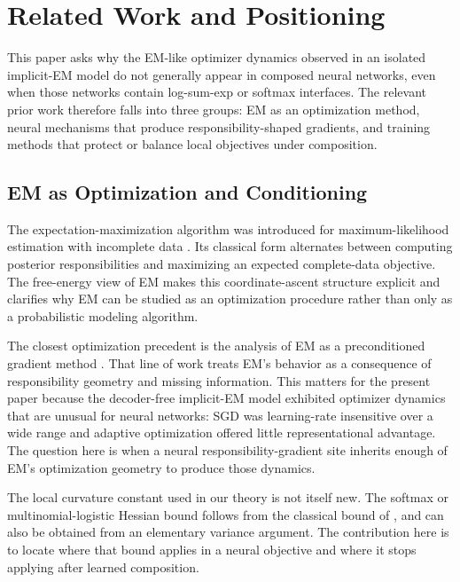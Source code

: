 \section{Related Work and Positioning}
\label{sec:related-work}
This paper asks why the EM-like optimizer dynamics observed in an isolated
implicit-EM model do not generally appear in composed neural networks, even
when those networks contain log-sum-exp or softmax interfaces. The relevant
prior work therefore falls into three groups: EM as an optimization method,
neural mechanisms that produce responsibility-shaped gradients, and training
methods that protect or balance local objectives under composition.

\subsection{EM as Optimization and Conditioning}
The expectation-maximization algorithm was introduced for maximum-likelihood
estimation with incomplete data \citep{dempster1977maximum}. Its classical
form alternates between computing posterior responsibilities and maximizing
an expected complete-data objective. The free-energy view of EM
\citep{neal1998view} makes this coordinate-ascent structure explicit and
clarifies why EM can be studied as an optimization procedure rather than only
as a probabilistic modeling algorithm.

The closest optimization precedent is the analysis of EM as a preconditioned
gradient method \citep{xu1996convergence}. That line of work treats EM's
behavior as a consequence of responsibility geometry and missing information.
This matters for the present paper because the decoder-free implicit-EM model
exhibited optimizer dynamics that are unusual for neural networks: SGD was
learning-rate insensitive over a wide range and adaptive optimization offered
little representational advantage. The question here is when a neural
responsibility-gradient site inherits enough of EM's optimization geometry to
produce those dynamics.

The local curvature constant used in our theory is not itself new. The
softmax or multinomial-logistic Hessian bound follows from the classical
bound of \citet{bohning1992multinomial}, and can also be obtained from an
elementary variance argument. The contribution here is to locate where that
bound applies in a neural objective and where it stops applying after learned
composition.

